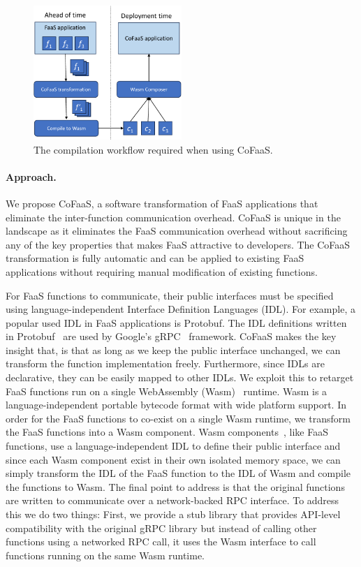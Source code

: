 \documentclass[../main.tex]{subfiles}
\begin{document}
\begin{refsection}
\begin{figure}[ht]
  \centering
  \includegraphics[width=0.5\textwidth]{papers/paper5-cofaas/figures/cofaas_compilation.pdf}
  \caption{\label{fig:cofaas-comp} The compilation workflow required when using CoFaaS.}
\end{figure}


\paragraph{Approach.}
We propose CoFaaS, a software transformation of FaaS applications that eliminate the inter-function communication overhead. CoFaaS is unique in the landscape as it eliminates the FaaS communication overhead without sacrificing any of the key properties that makes FaaS attractive to developers. The CoFaaS transformation is fully automatic and can be applied to existing FaaS applications without requiring manual modification of existing functions.


For FaaS functions to communicate, their public interfaces must be
specified using language-independent Interface Definition Languages
(IDL). For example, a popular used IDL in FaaS applications is
Protobuf. The IDL definitions written in Protobuf~\cite{protobuf} are
used by Google's gRPC~\cite{grpc} framework. CoFaaS makes the key
insight that, is that as long as we keep the public interface
unchanged, we can transform the function implementation
freely. Furthermore, since IDLs are declarative, they can be easily
mapped to other IDLs. We exploit this to retarget FaaS functions run
on a single WebAssembly (Wasm)~\cite{rossberg22_webas_core_specif}
runtime. Wasm is a language-independent portable bytecode format with
wide platform support. In order for the FaaS functions to co-exist on
a single Wasm runtime, we transform the FaaS functions into a Wasm
component. Wasm components~\cite{compmodel}, like FaaS functions, use
a language-independent IDL to define their public interface and since
each Wasm component exist in their own isolated memory space, we can
simply transform the IDL of the FaaS function to the IDL of Wasm and
compile the functions to Wasm. The final point to address is that the
original functions are written to communicate over a network-backed
RPC interface. To address this we do two things: First, we provide a
stub library that provides API-level compatibility with the original
gRPC library but instead of calling other functions using a networked
RPC call, it uses the Wasm interface to call functions running on the
same Wasm runtime.


\end{refsection}
\end{document}

